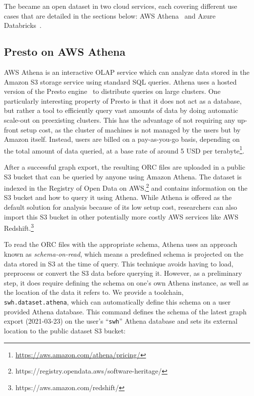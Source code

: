 The \SWHGD{} became an open dataset in two cloud services, each covering
different use cases that are detailed in the sections below: AWS
Athena~\cite{website-amazon-athena} and Azure
Databricks~\cite{website-azure-databricks}.

\subsection{Presto on AWS Athena}

AWS Athena is an interactive OLAP service which can analyze data stored in
the Amazon S3 storage service using standard SQL queries. Athena uses a hosted
version of the Presto engine~\cite{sethi2019presto} to distribute queries on
large clusters.  One particularly interesting property of Presto is that it
does not act as a database, but rather a tool to efficiently query vast amounts
of data by doing automatic scale-out on preexisting clusters. This has the
advantage of not requiring any up-front setup cost, as the cluster of machines
is not managed by the users but by Amazon itself. Instead, users are billed on
a pay-as-you-go basis, depending on the total amount of data queried, at a base
rate of around 5 USD per
terabyte\footnote{\url{https://aws.amazon.com/athena/pricing/}}.

After a successful graph export, the resulting ORC files are uploaded in a public
S3 bucket that can be queried by anyone using Amazon Athena. The dataset is
indexed in the Registry of Open Data on
AWS,\footnote{https://registry.opendata.aws/software-heritage/} and contains
information on the S3 bucket and how to query it using Athena. While Athena is
offered as the default solution for analysis because of its low setup cost,
researchers can also import this S3 bucket in other potentially more costly AWS
services like AWS Redshift.\footnote{https://aws.amazon.com/redshift/}

To read the ORC files with the appropriate schema, Athena uses an approach
known as \emph{schema-on-read}, which means a predefined schema is projected on
the data stored in S3 at the time of query. This technique avoids having to
load, preprocess or convert the S3 data before querying it. However, as a
preliminary step, it does require defining the schema on one's own Athena
instance, as well as the location of the data it refers to. We provide a
toolchain, \texttt{swh.dataset.athena}, which can automatically define this
schema on a user provided Athena database. This command defines the schema of
the latest graph export (2021-03-23) on the user's ``\texttt{swh}'' Athena
database and sets its external location to the public dataset S3 bucket:

